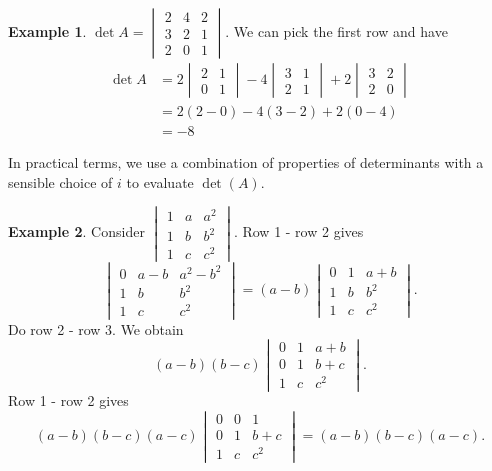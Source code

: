 \documentclass[a4paper]{article}
\theoremstyle{definition}
\newtheorem*{eg}{Example}
\begin{document}
\begin{eg}
  $\det A = \begin{vmatrix}2 & 4 & 2\\ 3 & 2 & 1\\ 2 & 0 & 1\end{vmatrix}$. We can pick the first row and have
    \begin{align*}
      \det A&= 2\begin{vmatrix}2 & 1\\0 & 1 \end{vmatrix} - 4\begin{vmatrix} 3 & 1\\ 2 & 1\end{vmatrix} + 2\begin{vmatrix}3 & 2 \\ 2 & 0\end{vmatrix}\\
      &= 2(2 - 0) - 4(3 - 2) + 2(0 - 4)\\
      &= -8
    \end{align*}
\end{eg}

In practical terms, we use a combination of properties of determinants with a sensible choice of $i$ to evaluate $\det(A)$.

\begin{eg}
  Consider $\begin{vmatrix}1 & a & a^2\\1 & b & b^2\\1 & c & c^2 \end{vmatrix}$. Row 1 - row 2 gives
  \[
  \begin{vmatrix}0 & a - b & a^2 - b^2\\1 & b & b^2\\1 & c & c^2 \end{vmatrix} = (a - b)\begin{vmatrix}0 & 1 & a + b\\1 & b & b^2\\1 & c & c^2 \end{vmatrix}.
  \]
  Do row 2 - row 3. We obtain
  \[
  (a - b)(b - c)\begin{vmatrix}0 & 1 & a + b\\0 & 1 & b + c\\1 & c & c^2 \end{vmatrix}.
  \]
  Row 1 - row 2 gives
  \[
  (a - b)(b - c)(a - c)\begin{vmatrix}0 & 0 & 1\\0 & 1 & b + c\\1 & c & c^2 \end{vmatrix} = (a - b)(b - c)(a - c).
  \]
\end{eg}
\end{document}
